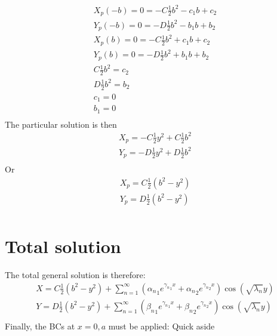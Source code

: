 \documentclass[11pt]{article}
\begin{document}
\begin{equation}\begin{aligned}
X_p(-b) = 0 = -C \frac{1}{2} b^2 - c_1 b + c_2 \\
Y_p(-b) = 0 = -D \frac{1}{2} b^2 - b_1 b + b_2 \\
X_p(b) = 0 = -C \frac{1}{2} b^2 + c_1 b + c_2 \\
Y_p(b) = 0 = -D \frac{1}{2} b^2 + b_1 b + b_2 \\
C \frac{1}{2} b^2 = c_2 \\
D \frac{1}{2} b^2 = b_2 \\
c_1 = 0 \\
b_1 = 0 \\
\end{aligned} \end{equation}
The particular solution is then
\begin{equation}\begin{aligned}
X_p = -C \frac{1}{2} y^2 + C \frac{1}{2} b^2 \\
Y_p = -D \frac{1}{2} y^2 + D \frac{1}{2} b^2 \\
\end{aligned} \end{equation}
Or
\begin{equation}\begin{aligned}
X_p = C \frac{1}{2} (b^2 - y^2) \\
Y_p = D \frac{1}{2} (b^2 - y^2) \\
\end{aligned} \end{equation}

\section{Total solution}
The total general solution is therefore:
\begin{equation}\begin{aligned}
X = C \frac{1}{2} (b^2 - y^2) + \sum_{n=1}^{\infty} \left( {\alpha_n}_1 e^{{\gamma_n}_1 x} + {\alpha_n}_2 e^{{\gamma_n}_2 x} \right) \cos(\sqrt{\lambda_n} y) \\
Y = D \frac{1}{2} (b^2 - y^2) + \sum_{n=1}^{\infty} \left( {\beta_n}_1  e^{{\gamma_n}_1 x} + {\beta_n}_2  e^{{\gamma_n}_2 x} \right) \cos(\sqrt{\lambda_n} y) \\
\end{aligned} \end{equation}
Finally, the BCs at $x=0,a$ must be applied:
Quick aside
\end{document}
